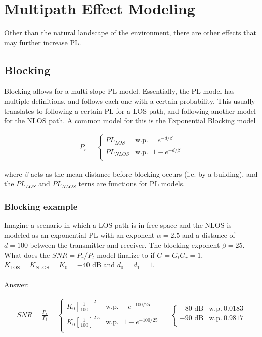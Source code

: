 \documentclass[12pt]{report} %
\begin{document}
\chapter{Multipath Effect Modeling}
Other than the natural landscape of the environment, there are other effects
that may further increase \gls{PL}.

\section{Blocking}
Blocking allows for a multi-slope \gls{PL} model. Essentially, the \gls{PL}
model has multiple definitions, and follows each one with a certain probability.
This usually translates to following a certain \gls{PL} for a \gls{LOS} path,
and following another model for the \gls{NLOS} path. A common model for this is
the Exponential Blocking model

\begin{align}
  \label{eq:exp_blocking}
  P_r = \left\{ \begin{array}{ll}
                  PL_{LOS}  & \text{w.p.} ~~~~~~ e^{-d/\beta}  \\
                  PL_{NLOS} & \text{w.p.} ~~~ 1 - e^{-d/\beta} \\
                \end{array}
  \right.
\end{align}

where $\beta$ acts as the mean distance before blocking occurs (i.e. by a building), and the $PL_{LOS}$ and $PL_{NLOS}$ terns are functions for \gls{PL} models.

\subsection*{Blocking example}
Imagine a scenario in which a \gls{LOS} path is in free space and the \gls{NLOS} is modeled as an exponential \gls{PL} with an exponent $\alpha = 2.5$ and a distance of $d = 100$ between the transmitter and receiver. The blocking exponent $\beta = 25$. What does the $SNR = P_r/P_t$ model finalize to if $G = G_t G_r = 1$, $K_{\text{LOS}} = K_{\text{NLOS}} = K_0 = -40$ dB and $d_0 = d_1 = 1$.
\\
\\
Answer:

\begin{align}
  SNR = \frac{P_r}{P_t} = \left\{ \begin{array}{ll}
                                    K_0 \left[\frac{1}{100}\right]^2     & \text{w.p.} ~~~~~~ e^{-100/25}  \\
                                    K_0 \left[\frac{1}{100}\right]^{2.5} & \text{w.p.} ~~~ 1 - e^{-100/25} \\
                                  \end{array}
  \right. \nonumber
  = \left\{ \begin{array}{ll}
              -80 \text{ dB} & \text{w.p.} ~ 0.0183 \\
              -90 \text{ dB} & \text{w.p.} ~ 0.9817 \\
            \end{array}
  \right. \nonumber
\end{align}
\end{document}
